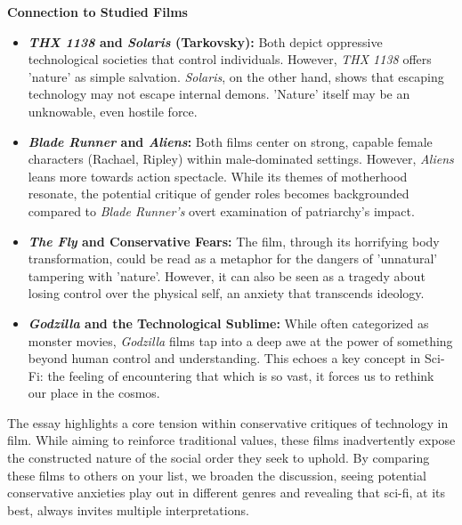 \documentclass[11pt,fleqn]{book} %
\begin{document}
\vspace{5pt}
\textbf{Connection to Studied Films}

\begin{itemize}
\item \textbf{\textit{THX 1138} and \textit{Solaris} (Tarkovsky):} Both depict oppressive technological societies that control individuals. However, \textit{THX 1138} offers 'nature' as simple salvation.  \textit{Solaris}, on the other hand,  shows that escaping technology may not escape internal demons.  'Nature' itself may be an unknowable, even hostile force.

\item \textbf{\textit{Blade Runner} and \textit{Aliens}:}  Both films center on strong, capable female characters (Rachael, Ripley) within male-dominated settings.  However, \textit{Aliens} leans more towards action spectacle. While its themes of motherhood resonate, the potential critique of gender roles becomes backgrounded compared to \textit{Blade Runner's} overt examination of patriarchy's impact.

\item \textbf{\textit{The Fly} and Conservative Fears:}  The film, through its horrifying body transformation, could be read as a metaphor for the dangers of 'unnatural' tampering  with 'nature'. However, it can also be seen as a tragedy about losing control over the physical self, an anxiety that transcends ideology.

\item \textbf{\textit{Godzilla} and the Technological Sublime:}  While often categorized as monster movies, \textit{Godzilla} films tap into a deep awe at the power of something beyond human control and understanding. This echoes a key concept in Sci-Fi: the feeling of encountering that which is so vast, it forces us to rethink our place in the cosmos. 
\end{itemize}

\vspace{5pt}

The essay highlights a core tension within conservative critiques of technology in film. While aiming to reinforce traditional values, these films inadvertently expose the constructed nature of the social order they seek to uphold.  By comparing these films to others on your list, we broaden the discussion, seeing potential conservative anxieties play out in different genres and revealing that sci-fi, at its best, always invites multiple interpretations. 
\end{document}

